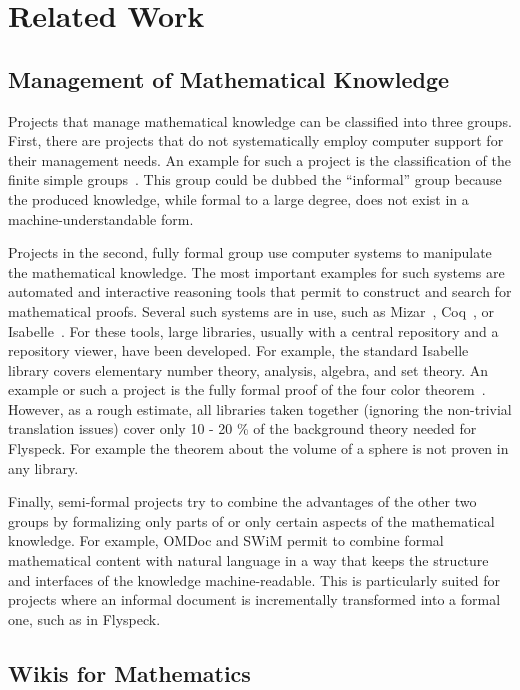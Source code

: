 \section{Related Work}
\label{sec:related}


\subsection{Management of Mathematical Knowledge}
\label{sec:mkm}

Projects that manage mathematical knowledge can be classified into three groups.  First, there are projects that do not systematically employ computer support for their management needs.  An example for such a project is the classification of the finite simple groups~\cite{Gorenstein-Lyons-Salomon:1994}.  This group could be dubbed the ``informal'' group because the produced knowledge, while formal to a large degree, does not exist in a machine-understandable form.

Projects in the second, fully formal group use computer systems to manipulate the mathematical knowledge.  The most important examples for such systems are automated and interactive reasoning tools that permit to construct and search for mathematical proofs. Several such systems are in use, such as Mizar~\cite{mizarmanual}, Coq~\cite{Coq}, or Isabelle~\cite{Isabelle}.  For these tools, large libraries, usually with a central repository and a repository viewer, have been developed.  For example, the standard Isabelle library covers elementary number theory, analysis, algebra, and set theory. An example or such a project is the fully formal proof of the four color theorem~\cite{Gonthier:FourColor}. However, as a rough estimate, all libraries taken together (ignoring the non-trivial translation issues) cover only 10 - 20 \% of the background theory needed for Flyspeck. For example the theorem about the volume of a sphere is not proven in any library.

Finally, semi-formal projects try to combine the advantages of the other two groups by formalizing only parts of or only certain aspects of the mathematical knowledge.  For example, OMDoc and SWiM permit to combine formal mathematical content with natural language in a way that keeps the structure and interfaces of the knowledge machine-readable.  This is particularly suited for projects where an informal document is incrementally transformed into a formal one, such as in Flyspeck.

\subsection{Wikis for Mathematics}
\label{sec:math-wiki}

